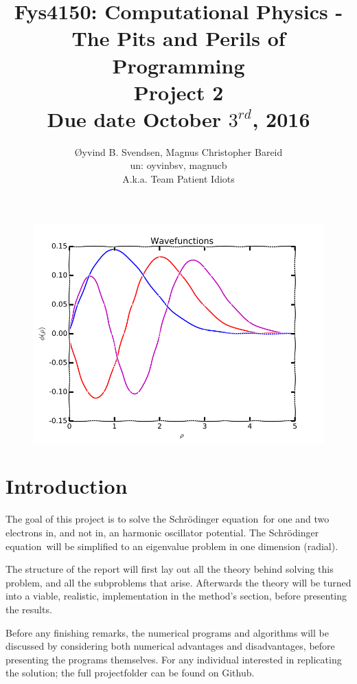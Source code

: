 \documentclass[11pt,a4paper,notitlepage]{article}
\title{\normalsize Fys4150: Computational Physics - The Pits and Perils of Programming \\
\vspace{10mm}
\huge Project 2\\
\vspace{10mm}
\normalsize Due date {\bf October $3^{rd}$, 2016}}
\author{Øyvind B. Svendsen, Magnus Christopher Bareid \\ un: oyvinbsv, magnucb \\ A.k.a. Team Patient Idiots}
\newcommand{\SE}{Schr\"odinger equation}
\begin{document}
\noindent
\maketitle
\vspace{10mm}

\begin{figure}[H]
	\centering	
	\includegraphics[scale=0.7]{frontpage.png}
\end{figure}

\begin{abstract}
\end{abstract}

\begin{center}
\end{center}

\newpage
\tableofcontents

\newpage
\section{Introduction}
The goal of this project is to solve the \SE \ for one and two electrons in, and not in, an harmonic oscillator potential. The \SE \ will be simplified to an eigenvalue problem in one dimension (radial). 

The structure of the report will first lay out all the theory behind solving this problem, and all the subproblems that arise. Afterwards the theory will be turned into a viable, realistic, implementation in the method's section, before presenting the results. 

Before any finishing remarks, the numerical programs and algorithms will be discussed by considering both numerical advantages and disadvantages, before presenting the programs themselves. For any individual interested in replicating the solution; the full projectfolder can be found on Github.
\end{document}
